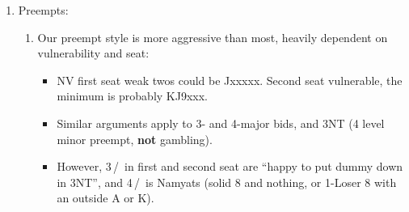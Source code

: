 \documentclass[12pt]{article}
\begin{document}
\begin{footnotesize}
\begin{enumerate}
\begin{enumerate}[label*=\arabic*,nosep]
\begin{itemize}[nosep]
                \item Cuebid is good 8+, GF
                \item Jump bids are good suits.
            \end{itemize}
            \item \label{itm:1ntoc}(1 suit)--1 NT is takeout, usually 8--14 HCP, guaranteeing 3+cards in all unbid suits.
            \begin{itemize}[nosep]
                \item With perfect shape, especially NV in 2nd, could be on 6 (Open chart only).
                \item With a singleton (16) or void (18) in bid suit, we may overcall 1NT with more than 14 HCP\@.
                \item We are fairly aggressive with this call, and can do it with 5 card suits; but with 4333, we will be on the top of the range.
                \item Pass is rare, but possible.
                \item New suits are natural and to play.
                \item Cuebid is Stayman-esque, and could be the start of a INV+ sequence.
                \item Jump bids are preemptive [Exception: INV at unfavourable].
                \item If 1 NT is doubled, new suits are to play (usually 5+), XX shows 4 cards in the highest unbid suit, and pass is any other (\textbf{not} to play).
            \end{itemize}
        \end{enumerate}
        \item \label{itm:preempt}Preempts:
        \begin{enumerate}[label*=\arabic*,nosep]
            \item Our preempt style is more aggressive than most, heavily dependent on vulnerability and seat:
            \begin{itemize}[nosep]
                \item \label{itm:2x}NV first seat weak twos could be Jxxxxx.
                      Second seat vulnerable, the minimum is probably KJ9xxx.
                \item \label{itm:3m}Similar arguments apply to 3- and 4-major bids, and 3NT (4 level minor preempt, \textbf{not} gambling).
                \item However, 3\,\bc/\rd\ in first and second seat are ``happy to put dummy down in 3NT'', and 4\,\bc/\rd\ is Namyats (solid 8 and nothing, or 1-Loser 8 with an outside A or K).

\end{itemize}
\end{enumerate}
\end{enumerate}
\end{footnotesize}
\end{document}
